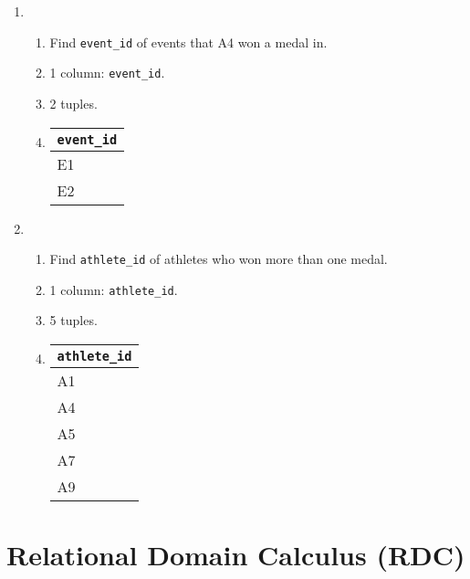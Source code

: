 \documentclass{homework}
\begin{document}
\begin{enumerate}
    \item
    \begin{enumerate}
        \item Find \texttt{event\_id} of events that A4 won a medal in.
        \item 1 column: \texttt{event\_id}.
        \item 2 tuples.
        \item 
        \begin{tabular}{@{}l@{}}
            \toprule
            \texttt{event\_id} \\ \midrule
            E1          \\
            E2          \\ \bottomrule
        \end{tabular}
    \end{enumerate}

    \item \begin{enumerate}
        \item Find \texttt{athlete\_id} of athletes who won more than one medal.
        \item 1 column: \texttt{athlete\_id}.
        \item 5 tuples.
        \item
        \begin{tabular}{@{}l@{}}
            \toprule
            \texttt{athlete\_id} \\ \midrule
            A1          \\
            A4          \\
            A5          \\
            A7          \\
            A9          \\ \bottomrule
        \end{tabular}
    \end{enumerate}
\end{enumerate}
\newpage

\section{Relational Domain Calculus (RDC)}
\end{document}
